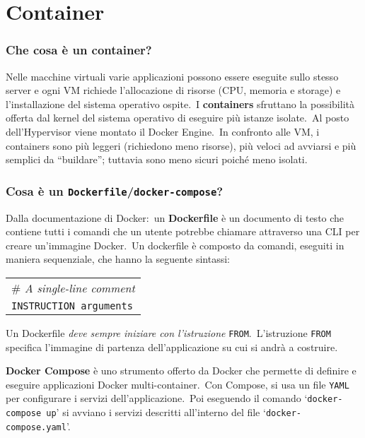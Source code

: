 \documentclass[12pt, a4paper]{article}
\begin{document}
\section{Container}
\subsubsection*{Che cosa è un container?}

Nelle macchine virtuali varie applicazioni possono essere eseguite sullo stesso server e ogni VM richiede l'allocazione di risorse (CPU, memoria e storage) e l'installazione del sistema operativo ospite.\
I \textbf{containers} sfruttano la possibilità offerta dal kernel del sistema operativo di eseguire più istanze isolate.\ 
Al posto dell'Hypervisor viene montato il Docker Engine.\
In confronto alle VM, i containers sono più leggeri (richiedono meno risorse), più veloci ad avviarsi e più semplici da ``buildare''; tuttavia sono meno sicuri poiché meno isolati.

\subsubsection*{Cosa è un \texttt{Dockerfile}/\texttt{docker-compose}?}

Dalla documentazione di Docker:\ un \textbf{Dockerfile} è un documento di testo che
contiene tutti i comandi che un utente potrebbe chiamare attraverso una CLI per creare un'immagine Docker.\
Un dockerfile è composto da comandi, eseguiti in maniera sequenziale, che hanno la seguente sintassi:
\begin{table}[H]
	\centering
	\begin{tabular}{l}
	\# \textit{A single-line comment}\\
	\texttt{INSTRUCTION arguments}\\
		\end{tabular}
\end{table}

\noindent Un Dockerfile \textit{deve sempre iniziare con l'istruzione} \texttt{FROM}.\
L'istruzione \texttt{FROM} specifica l'immagine di partenza dell'applicazione su cui si andrà a costruire.\

\textbf{Docker Compose} è uno strumento offerto da Docker che permette di definire e
eseguire applicazioni Docker multi-container.\
Con Compose, si usa un file \texttt{YAML} per configurare i servizi dell'applicazione.\
Poi eseguendo il comando `\texttt{docker-compose up}' si avviano i servizi descritti all'interno del file `\texttt{docker-compose.yaml}'.
\end{document}
